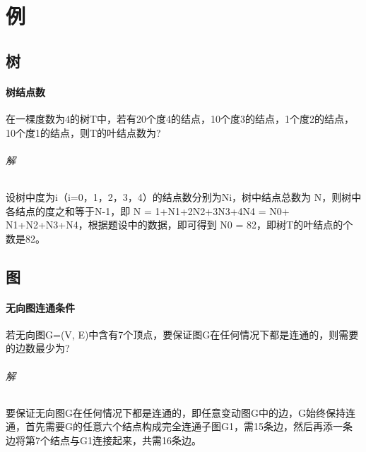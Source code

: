 
\chapter{例}

\section{树}

\subsubsection{树结点数}
在一棵度数为4的树T中，若有20个度4的结点，10个度3的结点，1个度2的结点，10个度1的结点，则T的叶结点数为?

\subparagraph{解}
设树中度为i（i=0，1，2，3，4）的结点数分别为Ni，树中结点总数为 N，则树中各结点的度之和等于N-1，即 N = 1+N1+2N2+3N3+4N4 = N0+ N1+N2+N3+N4，根据题设中的数据，即可得到 N0 = 82，即树T的叶结点的个数是82。


\section{图}

\subsubsection{无向图连通条件}
若无向图G=(V, E)中含有7个顶点，要保证图G在任何情况下都是连通的，则需要的边数最少为?

\subparagraph{解}
要保证无向图G在任何情况下都是连通的，即任意变动图G中的边，G始终保持连通，首先需要G的任意六个结点构成完全连通子图G1，需15条边，然后再添一条边将第7个结点与G1连接起来，共需16条边。 

